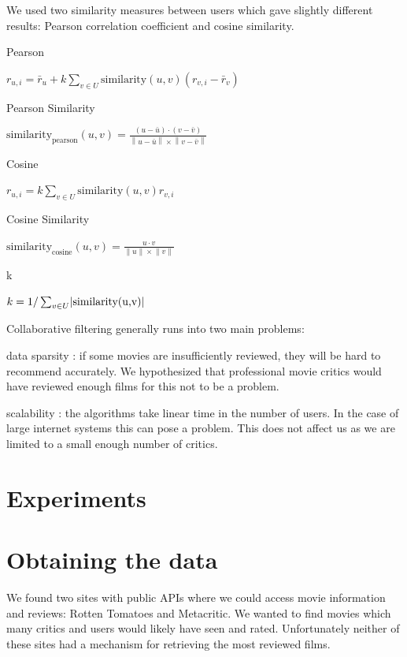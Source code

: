\documentclass[12pt]{article}
\newcommand{\norm}[1]{\left\lVert#1\right\rVert}
\DeclarePairedDelimiter\abs{\lvert}{\rvert}%
\begin{document}
We used two similarity measures between users which gave slightly different results: Pearson correlation coefficient and cosine similarity.






Pearson

\( r_{u,i} = \bar{r}_u + k \sum_{v \in U} \text{similarity}(u,v) (r_{v,i}-\bar{r}_v) \)

Pearson Similarity

\( \text{similarity}_{\text{pearson}}(u,v) = \frac{ (u - \bar{u}) \cdot (v - \bar{v})}{\norm{u - \bar{u}} \times \norm{v-\bar{v}}} \)

Cosine

\( r_{u,i} = k \sum_{v \in U} \text{similarity}(u,v) r_{v,i}  \)

Cosine Similarity

\( \text{similarity}_{\text{cosine}}(u,v) = \frac{u \cdot v}{\norm{u} \times \norm{v}} \)

k

\( k = 1 / \sum_{v \in U} \abs{\text{similarity(u,v)}} \)




Collaborative filtering generally runs into two main problems:

data sparsity : if some movies are insufficiently reviewed, they will be hard to recommend accurately. 
We hypothesized that professional movie critics would have reviewed enough films for this not to be a problem.

scalability : the algorithms take linear time in the number of users. In the case of large internet systems this can pose a problem.
This does not affect us as we are limited to a small enough number of critics.



\section{Experiments}

\section{Obtaining the data}

	We found two sites with public APIs where we could access movie information and reviews: Rotten Tomatoes and Metacritic. We wanted to find movies which many critics and users would likely have seen and rated. Unfortunately neither of these sites had a mechanism for retrieving the most reviewed films. 
\end{document}
